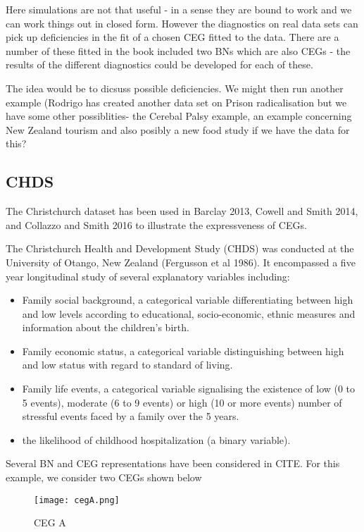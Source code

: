 \documentclass[12pt]{article}
\begin{document}
Here simulations are not that useful - in a sense they are bound to work and
we can work things out in closed form. However the diagnostics on real data
sets can pick up deficiencies in the fit of a chosen CEG fitted to the data.
There are a number of these fitted in the book included two BNs which are
also CEGs - the results of the different diagnostics could be developed for
each of these. 

The idea would be to dicsuss possible deficiencies. We might
then run another example (Rodrigo has created another data set on Prison
radicalisation but we have some other possiblities- the Cerebal Palsy
example, an example concerning New Zealand tourism and also posibly a new
food study if we have the data for this? 


\subsection{CHDS}

The Christchurch dataset has been used in Barclay 2013, Cowell and Smith 2014, and Collazzo and Smith 2016 to illustrate the expressveness of CEGs. 

The Christchurch Health and Development Study (CHDS) was conducted at the University of Otango, New Zealand (Fergusson et al 1986). It encompassed a five year longitudinal study of several explanatory variables including: 
\begin{itemize}
	\item Family social background, a categorical variable differentiating between high and low levels according to educational, socio-economic, ethnic measures and information about the children’s birth.
	\item Family economic status, a categorical variable distinguishing between high and
	low status with regard to standard of living.
	\item Family life events, a categorical variable signalising the existence of low (0 to 5 events), moderate (6 to 9 events) or high (10 or more events) number of stressful events faced by a family over the 5 years.
	\item the likelihood of childhood hospitalization (a binary variable). 
\end{itemize}

Several BN and CEG representations have been considered in CITE. For this example, we consider two CEGs shown below

\begin{figure}
	\texttt{[image: cegA.png]}
	\caption{CEG A}
\end{figure}
\end{document}
